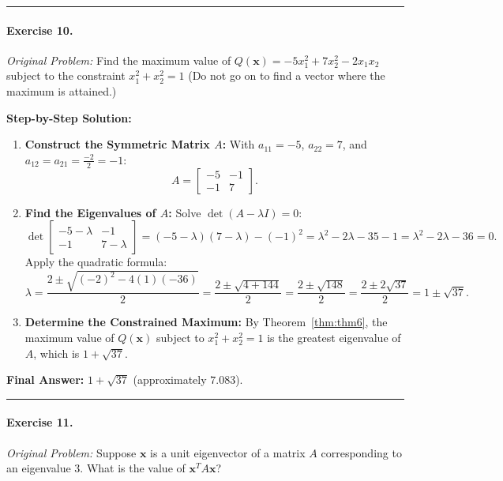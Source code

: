 \documentclass[11pt, letterpaper]{article}
\theoremstyle{definition}
\theoremstyle{remark}
\begin{document}
\medskip
\hrule
\medskip

\paragraph{Exercise 10.}
\emph{Original Problem:} Find the maximum value of $Q(\mathbf{x}) = -5x_1^2 + 7x_2^2 - 2x_1 x_2$ subject to the constraint $x_1^2 + x_2^2 = 1$ (Do not go on to find a vector where the maximum is attained.)

\textbf{Step-by-Step Solution:}
\begin{enumerate}[leftmargin=2em]
    \item \textbf{Construct the Symmetric Matrix $A$:}
    With $a_{11} = -5$, $a_{22} = 7$, and $a_{12} = a_{21} = \frac{-2}{2} = -1$:
    \[
    A = \begin{bmatrix} -5 & -1 \\ -1 & 7 \end{bmatrix}.
    \]
    \item \textbf{Find the Eigenvalues of $A$:}
    Solve $\det(A - \lambda I) = 0$:
    \[
    \det \begin{bmatrix} -5 - \lambda & -1 \\ -1 & 7 - \lambda \end{bmatrix} = (-5 - \lambda)(7 - \lambda) - (-1)^2 = \lambda^2 - 2\lambda - 35 - 1 = \lambda^2 - 2\lambda - 36 = 0.
    \]
    Apply the quadratic formula:
    \[
    \lambda = \frac{2 \pm \sqrt{(-2)^2 - 4(1)(-36)}}{2} = \frac{2 \pm \sqrt{4 + 144}}{2} = \frac{2 \pm \sqrt{148}}{2} = \frac{2 \pm 2\sqrt{37}}{2} = 1 \pm \sqrt{37}.
    \]
    \item \textbf{Determine the Constrained Maximum:}
    By Theorem~\ref{thm:thm6}, the maximum value of $Q(\mathbf{x})$ subject to $x_1^2 + x_2^2 = 1$ is the greatest eigenvalue of $A$, which is $1 + \sqrt{37}$.
\end{enumerate}
\textbf{Final Answer:} $1 + \sqrt{37}$ (approximately $7.083$).

\medskip
\hrule
\medskip

\paragraph{Exercise 11.}
\emph{Original Problem:} Suppose $\mathbf{x}$ is a unit eigenvector of a matrix $A$ corresponding to an eigenvalue $3$. What is the value of $\mathbf{x}^T A \mathbf{x}$?
\end{document}
